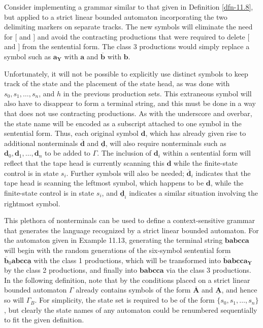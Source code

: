 Consider implementing a grammar similar to that given in Definition \ref{dfn-11.8}, but
applied to a strict linear bounded automaton incorporating the two delimiting
markers on separate tracks. The new symbols will eliminate the need for $[$ and
$]$ and avoid the contracting productions that were required to delete $[$ and
$]$ from the sentential form. The class 3 productions would simply replace a
symbol such as $\pmb{a}_{\pmb{Y}}$ with $\pmb{a}$ and $\overline{\pmb{b}}$ with
$\pmb{b}$.

Unfortunately, it will not be possible to explicitly use distinct symbols to
keep track of the state and the placement of the state head, as was done with
$s_0,s_1,\ldots,s_n$, and $h$ in the previous production sets. This extraneous
symbol will also have to disappear to form a terminal string, and this must be
done in a way that does not use contracting productions. As with the underscore
and overbar, the state name will be encoded as a subscript attached to one
symbol in the sentential form. Thus, each original symbol $\pmb{d}$, which has
already given rise to additional nonterminals $\overline{\pmb{d}}$ and
$\underline{\pmb{d}}$, will also require nonterminals such as $\pmb{d}_0,\pmb{d}_1,
\ldots,\pmb{d}_n$ to be added to $\Gamma$. The inclusion of $\pmb{d}_i$ within a
sentential form will reflect that the tape head is currently scanning this
$\pmb{d}$ while the finite-state control is in state $s_i$. Further symbols will
also be needed; $\overline{\pmb{d}}_i$ indicates that the tape head is scanning
the leftmost symbol, which happens to be $\pmb{d}$, while the finite-state
control is in state $s_i$, and $\pmb{\underline{d}}_i$ indicates a similar
situation involving the rightmost symbol.

This plethora of nonterminals can be used to define a context-sensitive grammar
that generates the language recognized by a strict linear bounded automaton.
For the automaton given in Example 11.13, generating the terminal string
${\pmb{b}}\pmb{abcca}$ will begin with the random generations of the
six-symbol sentential form $\overline{\pmb{b}}_0\pmb{abcc}\underline{\pmb{a}}$ with the class 1
productions, which will be transformed into $\overline{\pmb{b}}\pmb{abcca_{Y}}$
by the class 2 productions, and finally into $\pmb{babcca}$ via the class 3
productions. In the following definition, note that by the conditions placed on
a strict linear bounded automaton $\Gamma$ already contains symbols of the form
$\overline{\pmb{A}}$ and $\underline{\pmb{A}}$, and hence so will $\Gamma_{  B}$.
For simplicity, the state set is required to be of the form $\{s_0,s_1,\ldots,
s_n\}$, but clearly the state names of any automaton could be renumbered
sequentially to fit the given definition.

